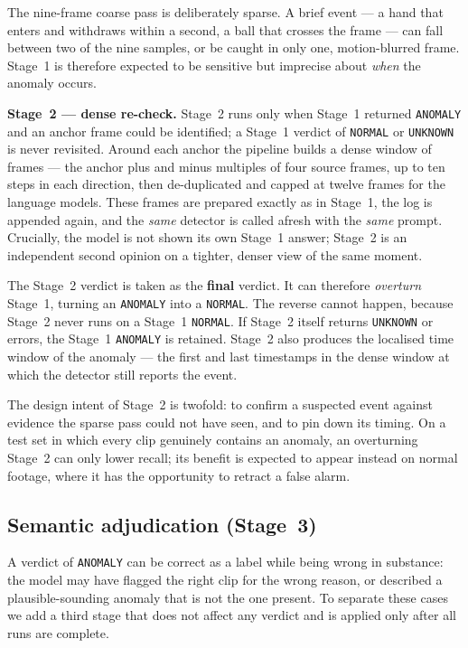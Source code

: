 \documentclass[11pt,a4paper]{article}
\begin{document}
The nine-frame coarse pass is deliberately sparse. A brief event --- a
hand that enters and withdraws within a second, a ball that crosses the
frame --- can fall between two of the nine samples, or be caught in only
one, motion-blurred frame. Stage~1 is therefore expected to be sensitive
but imprecise about \emph{when} the anomaly occurs.

\textbf{Stage~2 --- dense re-check.} Stage~2 runs only when Stage~1
returned \texttt{ANOMALY} and an anchor frame could be identified; a
Stage~1 verdict of \texttt{NORMAL} or \texttt{UNKNOWN} is never revisited.
Around each anchor the pipeline builds a dense window of frames --- the
anchor plus and minus multiples of four source frames, up to ten steps in
each direction, then de-duplicated and capped at twelve frames for the
language models. These frames are prepared exactly as in Stage~1, the log
is appended again, and the \emph{same} detector is called afresh with the
\emph{same} prompt. Crucially, the model is not shown its own Stage~1
answer; Stage~2 is an independent second opinion on a tighter, denser view
of the same moment.

The Stage~2 verdict is taken as the \textbf{final} verdict. It can
therefore \emph{overturn} Stage~1, turning an \texttt{ANOMALY} into a
\texttt{NORMAL}. The reverse cannot happen, because Stage~2 never runs on
a Stage~1 \texttt{NORMAL}. If Stage~2 itself returns \texttt{UNKNOWN} or
errors, the Stage~1 \texttt{ANOMALY} is retained. Stage~2 also produces
the localised time window of the anomaly --- the first and last timestamps
in the dense window at which the detector still reports the event.

The design intent of Stage~2 is twofold: to confirm a suspected event
against evidence the sparse pass could not have seen, and to pin down its
timing. On a test set in which every clip genuinely contains an anomaly,
an overturning Stage~2 can only lower recall; its benefit is expected to
appear instead on normal footage, where it has the opportunity to retract
a false alarm.

\subsection{Semantic adjudication (Stage~3)}

A verdict of \texttt{ANOMALY} can be correct as a label while being wrong
in substance: the model may have flagged the right clip for the wrong
reason, or described a plausible-sounding anomaly that is not the one
present. To separate these cases we add a third stage that does not affect
any verdict and is applied only after all runs are complete.
\end{document}
